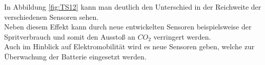                      In Abbildung \ref{fig:TS12} kann man deutlich den Unterschied in der Reichweite der verschiedenen Sensoren sehen.\\
                     
                     Neben diesem Effekt kann durch neue entwickelten Sensoren beispielsweise der Spritverbrauch und somit den Ausstoß an $CO_2$ verringert werden.\\
                     Auch im Hinblick auf Elektromobilität wird es neue Sensoren geben, welche zur Überwachung der Batterie eingesetzt werden.

               
                
          



        
    

    